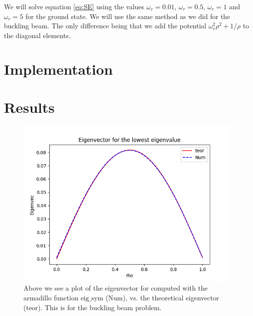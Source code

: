 \documentclass[norsk,a4paper,12pt]{article}
\begin{document}
We will solve equation \ref{eq:SE} using the values $\omega_r = 0.01$, $\omega_r = 0.5$, $\omega_r =1$ and $\omega_r = 5$ for the ground state. We will use the same method as we did for the buckling beam. The only difference being that we add the potential $\omega_r^2\rho^2+1/\rho$ to the diagonal elements.

\section{Implementation}

\section{Results}
\begin{figure}[H]
	\centering
	\includegraphics[width=\linewidth]{Egenvektorer1.png}
	\caption{Above we see a plot of the eigenvector for computed with the armadillo function $\text{eig\_sym}$ ($\text{Num}$), vs. the theoretical eigenvector (teor). This is for the buckling beam problem.}
	\label{fig:egen1}
\end{figure}
\end{document}
